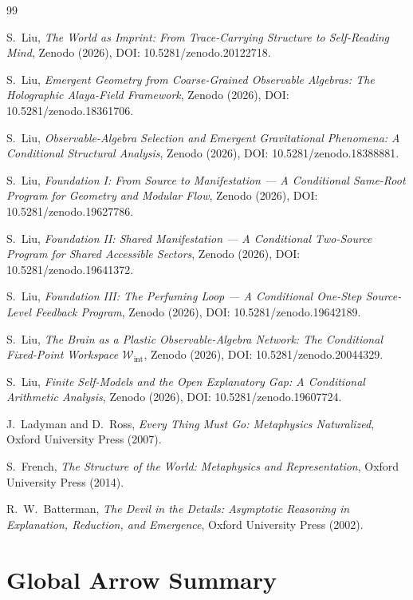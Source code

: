 \documentclass[12pt,a4paper]{article}
\begin{document}
\begin{thebibliography}{99}

S.~Liu, \emph{The World as Imprint: From Trace-Carrying Structure to Self-Reading Mind}, Zenodo (2026), DOI: 10.5281/zenodo.20122718.

S.~Liu, \emph{Emergent Geometry from Coarse-Grained Observable Algebras: The Holographic Alaya-Field Framework}, Zenodo (2026), DOI: 10.5281/zenodo.18361706.

S.~Liu, \emph{Observable-Algebra Selection and Emergent Gravitational Phenomena: A Conditional Structural Analysis}, Zenodo (2026), DOI: 10.5281/zenodo.18388881.

S.~Liu, \emph{Foundation I: From Source to Manifestation --- A Conditional Same-Root Program for Geometry and Modular Flow}, Zenodo (2026), DOI: 10.5281/zenodo.19627786.

S.~Liu, \emph{Foundation II: Shared Manifestation --- A Conditional Two-Source Program for Shared Accessible Sectors}, Zenodo (2026), DOI: 10.5281/zenodo.19641372.

S.~Liu, \emph{Foundation III: The Perfuming Loop --- A Conditional One-Step Source-Level Feedback Program}, Zenodo (2026), DOI: 10.5281/zenodo.19642189.

S.~Liu, \emph{The Brain as a Plastic Observable-Algebra Network: The Conditional Fixed-Point Workspace $\mathcal{W}_{\mathrm{int}}$}, Zenodo (2026), DOI: 10.5281/zenodo.20044329.

S.~Liu, \emph{Finite Self-Models and the Open Explanatory Gap: A Conditional Arithmetic Analysis}, Zenodo (2026), DOI: 10.5281/zenodo.19607724.

J.~Ladyman and D.~Ross,
\emph{Every Thing Must Go: Metaphysics Naturalized},
Oxford University Press (2007).

S.~French,
\emph{The Structure of the World: Metaphysics and Representation},
Oxford University Press (2014).

R.~W.~Batterman,
\emph{The Devil in the Details: Asymptotic Reasoning in Explanation, Reduction, and Emergence},
Oxford University Press (2002).

\end{thebibliography}

\clearpage
\section{Global Arrow Summary}
\end{document}
